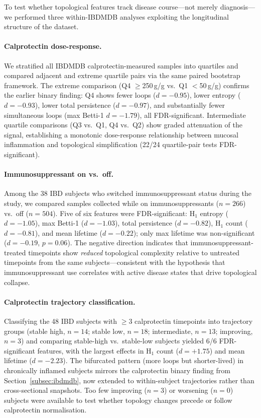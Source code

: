 To test whether topological features track disease course---not merely
diagnosis---we performed three within-IBDMDB analyses exploiting the
longitudinal structure of the dataset.

\paragraph{Calprotectin dose-response.}
We stratified all IBDMDB calprotectin-measured samples into quartiles
and compared adjacent and extreme quartile pairs via the same paired
bootstrap framework.
The extreme comparison (Q4 $\geq$250\,\textmu g/g vs.\ Q1 $<$50\,\textmu g/g)
confirms the earlier binary finding: Q4 shows fewer loops
($d = -0.95$), lower entropy ($d = -0.93$), lower total persistence
($d = -0.97$), and substantially fewer simultaneous loops
(max Betti-1 $d = -1.79$), all FDR-significant.
Intermediate quartile comparisons (Q3 vs.\ Q1, Q4 vs.\ Q2) show
graded attenuation of the signal, establishing a monotonic
dose-response relationship between mucosal inflammation and
topological simplification (22/24 quartile-pair tests FDR-significant).

\paragraph{Immunosuppressant on vs.\ off.}
Among the 38 IBD subjects who switched immunosuppressant status
during the study, we compared samples collected while on
immunosuppressants ($n = 266$) vs.\ off ($n = 504$).
Five of six features were FDR-significant: H$_1$ entropy ($d = -1.05$),
max Betti-1 ($d = -1.03$), total persistence ($d = -0.82$),
H$_1$ count ($d = -0.81$), and mean lifetime ($d = -0.22$);
only max lifetime was non-significant ($d = -0.19$, $p = 0.06$).
The negative direction indicates that immunosuppressant-treated
timepoints show \emph{reduced} topological complexity relative to
untreated timepoints from the same subjects---consistent with the
hypothesis that immunosuppressant use correlates with active disease
states that drive topological collapse.

\paragraph{Calprotectin trajectory classification.}
Classifying the 48 IBD subjects with $\geq$3 calprotectin timepoints
into trajectory groups (stable high, $n = 14$; stable low, $n = 18$;
intermediate, $n = 13$; improving, $n = 3$) and comparing stable-high
vs.\ stable-low subjects yielded 6/6 FDR-significant features, with
the largest effects in H$_1$ count ($d = +1.75$) and mean lifetime
($d = -2.23$).
The bifurcated pattern (more loops but shorter-lived) in chronically
inflamed subjects mirrors the calprotectin binary finding from
Section~\ref{subsec:ibdmdb}, now extended to within-subject trajectories
rather than cross-sectional snapshots.
Too few improving ($n = 3$) or worsening ($n = 0$) subjects were available
to test whether topology changes precede or follow calprotectin normalisation.
